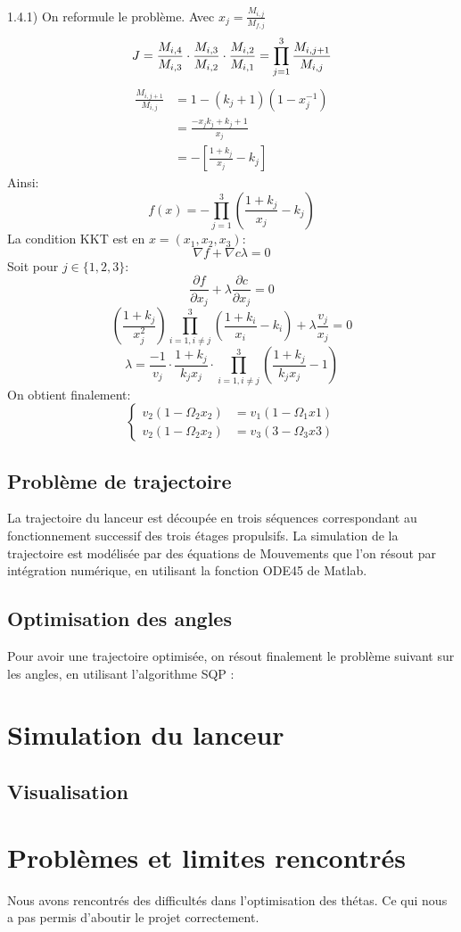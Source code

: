\documentclass[a4paper,20pt]{article}
\begin{document}
1.4.1) On reformule le probl\`eme. Avec $x_j=\frac{M_{i,j}}{M_{f,j}}$
$$
J=\frac{M_{i,4}}{M_{i,3}}\cdot\frac{M_{i,3}}{M_{i,2}}
\cdot\frac{M_{i,2}}{M_{i,1}}=\prod\limits_{j=1}^3\frac{M_{i,j+1}}{M_{i,j}} \\
$$
\begin{equation*}
\begin{split}
\frac{M_{i,j+1}}{M_{i,j}}&=1-(k_j+1)(1-x_j^{-1}) \\
&=\frac{-x_jk_j+k_j+1}{x_j} \\
&=-\left[\frac{1+k_j}{x_j}-k_j\right]
\end{split}
\end{equation*}
Ainsi:
$$
f(x)=-\prod\limits_{j=1}^3\left(\frac{1+k_j}{x_j}-k_j\right)
$$
La condition KKT est en $x=(x_1, x_2, x_3)$:
$$
\nabla f+\nabla c\lambda=0
$$
Soit pour $j\in\{1, 2, 3\}$:
$$
\frac{\partial f}{\partial x_j}+\lambda\frac{\partial c}{\partial x_j}=0
$$
$$
\left(\frac{1+k_j}{x_j^2}\right)\prod\limits_{i=1, i\neq j}^3
\left(\frac{1+k_i}{x_i}-k_i\right)+\lambda\frac{v_j}{x_j}=0
$$
$$
\lambda=\frac{-1}{v_j}\cdot\frac{1+k_j}{k_jx_j}
\cdot\prod\limits_{i=1, i\neq j}^3\left(\frac{1+k_j}{k_jx_j}-1\right)
$$
On obtient finalement:
$$
\begin{cases}
v_2(1-\Omega_2x_2)&=v_1(1-\Omega_1x1) \\
v_2(1-\Omega_2x_2)&=v_3(3-\Omega_3x3)
\end{cases}
$$
\subsection{Probl\`eme de trajectoire}
La trajectoire du lanceur est d\'ecoup\'ee en trois s\'equences correspondant au
 fonctionnement successif des trois \'etages propulsifs. La simulation de la
 trajectoire est mod\'elis\'ee par des \'equations de Mouvements que l'on
 r\'esout par int\'egration num\'erique, en utilisant la fonction ODE45 de
 Matlab.

\subsection{Optimisation des angles}
Pour avoir une trajectoire optimis\'ee, on r\'esout finalement le probl\`eme
 suivant sur les angles, en utilisant l'algorithme SQP :

\section{Simulation du lanceur}
\subsection{Visualisation}
\section{Probl\`emes et limites rencontr\'es}

Nous avons rencontrés des difficultés dans l'optimisation des thétas. Ce qui nous a pas permis d'aboutir le projet correctement.
\end{document}
